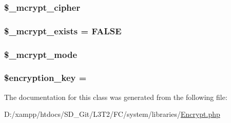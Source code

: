 \subsubsection[{\$\+\_\+mcrypt\+\_\+cipher}]{\setlength{\rightskip}{0pt plus 5cm}\$\+\_\+mcrypt\+\_\+cipher\hspace{0.3cm}{\ttfamily [protected]}}\label{class_c_i___encrypt_ab2cdedd99c4818b191c667f5e081a2db}
\hypertarget{class_c_i___encrypt_aaf4246798dad057cc4e294706e5e4e37}{}
\subsubsection[{\$\+\_\+mcrypt\+\_\+exists}]{\setlength{\rightskip}{0pt plus 5cm}\$\+\_\+mcrypt\+\_\+exists = F\+A\+L\+S\+E\hspace{0.3cm}{\ttfamily [protected]}}\label{class_c_i___encrypt_aaf4246798dad057cc4e294706e5e4e37}
\hypertarget{class_c_i___encrypt_ace4d98b5320c7fe75e6a38505abcdb82}{}
\subsubsection[{\$\+\_\+mcrypt\+\_\+mode}]{\setlength{\rightskip}{0pt plus 5cm}\$\+\_\+mcrypt\+\_\+mode\hspace{0.3cm}{\ttfamily [protected]}}\label{class_c_i___encrypt_ace4d98b5320c7fe75e6a38505abcdb82}
\hypertarget{class_c_i___encrypt_a35bbf76a5bcca90ca9b39368ed28121c}{}
\subsubsection[{\$encryption\+\_\+key}]{\setlength{\rightskip}{0pt plus 5cm}\$encryption\+\_\+key = \textquotesingle{}\textquotesingle{}}\label{class_c_i___encrypt_a35bbf76a5bcca90ca9b39368ed28121c}


The documentation for this class was generated from the following file\+:\begin{DoxyCompactItemize}
\item 
D\+:/xampp/htdocs/\+S\+D\+\_\+\+Git/\+L3\+T2/\+F\+C/system/libraries/\hyperlink{system_2libraries_2_encrypt_8php}{Encrypt.\+php}\end{DoxyCompactItemize}
